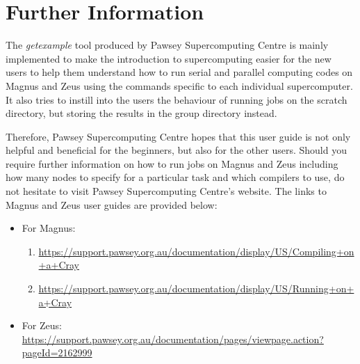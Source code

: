 \section{Further Information}

The \emph{getexample} tool produced by Pawsey Supercomputing Centre is mainly implemented to make the introduction to supercomputing easier for the new 
users to help them understand how to run serial and parallel computing codes on Magnus and Zeus using the commands specific to each individual
supercomputer. It also tries to instill into the users the behaviour of running jobs on the scratch directory, but storing the results in the group directory
instead.

Therefore, Pawsey Supercomputing Centre hopes that this user guide is not only helpful and beneficial for the beginners, but also for the other users. 
Should you require further information on how to run jobs on Magnus and Zeus including how many nodes to specify for a particular task and which
compilers to use, do not hesitate to visit Pawsey Supercomputing Centre's website. The links to Magnus and Zeus user guides are provided below:

\begin{itemize}
\item For Magnus:
\begin{enumerate}
\item \url{https://support.pawsey.org.au/documentation/display/US/Compiling+on+a+Cray}
\item \url{https://support.pawsey.org.au/documentation/display/US/Running+on+a+Cray}
\end{enumerate}
\item For Zeus:\\
\url{https://support.pawsey.org.au/documentation/pages/viewpage.action?pageId=2162999}
\end{itemize}

